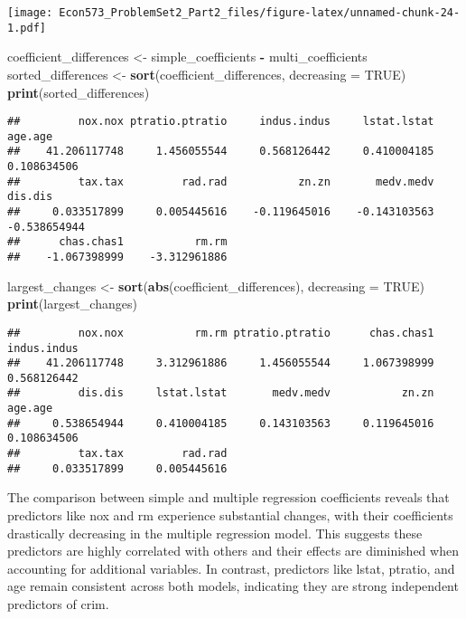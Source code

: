 \documentclass[
]{article}
\newenvironment{Shaded}{\begin{snugshade}}{\end{snugshade}}
\newcommand{\AttributeTok}[1]{\textcolor[rgb]{0.13,0.29,0.53}{#1}}
\newcommand{\ConstantTok}[1]{\textcolor[rgb]{0.56,0.35,0.01}{#1}}
\newcommand{\FunctionTok}[1]{\textcolor[rgb]{0.13,0.29,0.53}{\textbf{#1}}}
\newcommand{\NormalTok}[1]{#1}
\newcommand{\OtherTok}[1]{\textcolor[rgb]{0.56,0.35,0.01}{#1}}
\newcommand{\SpecialCharTok}[1]{\textcolor[rgb]{0.81,0.36,0.00}{\textbf{#1}}}
\begin{document}
\texttt{[image: Econ573\_ProblemSet2\_Part2\_files/figure-latex/unnamed-chunk-24-1.pdf]}

\begin{Shaded}
\begin{Highlighting}[]
\NormalTok{coefficient\_differences }\OtherTok{\textless{}{-}}\NormalTok{ simple\_coefficients }\SpecialCharTok{{-}}\NormalTok{ multi\_coefficients}
\NormalTok{sorted\_differences }\OtherTok{\textless{}{-}} \FunctionTok{sort}\NormalTok{(coefficient\_differences, }\AttributeTok{decreasing =} \ConstantTok{TRUE}\NormalTok{)}
\FunctionTok{print}\NormalTok{(sorted\_differences)}
\end{Highlighting}
\end{Shaded}

\begin{verbatim}
##         nox.nox ptratio.ptratio     indus.indus     lstat.lstat         age.age 
##    41.206117748     1.456055544     0.568126442     0.410004185     0.108634506 
##         tax.tax         rad.rad           zn.zn       medv.medv         dis.dis 
##     0.033517899     0.005445616    -0.119645016    -0.143103563    -0.538654944 
##      chas.chas1           rm.rm 
##    -1.067398999    -3.312961886
\end{verbatim}

\begin{Shaded}
\begin{Highlighting}[]
\NormalTok{largest\_changes }\OtherTok{\textless{}{-}} \FunctionTok{sort}\NormalTok{(}\FunctionTok{abs}\NormalTok{(coefficient\_differences), }\AttributeTok{decreasing =} \ConstantTok{TRUE}\NormalTok{)}
\FunctionTok{print}\NormalTok{(largest\_changes)}
\end{Highlighting}
\end{Shaded}

\begin{verbatim}
##         nox.nox           rm.rm ptratio.ptratio      chas.chas1     indus.indus 
##    41.206117748     3.312961886     1.456055544     1.067398999     0.568126442 
##         dis.dis     lstat.lstat       medv.medv           zn.zn         age.age 
##     0.538654944     0.410004185     0.143103563     0.119645016     0.108634506 
##         tax.tax         rad.rad 
##     0.033517899     0.005445616
\end{verbatim}

The comparison between simple and multiple regression coefficients
reveals that predictors like nox and rm experience substantial changes,
with their coefficients drastically decreasing in the multiple
regression model. This suggests these predictors are highly correlated
with others and their effects are diminished when accounting for
additional variables. In contrast, predictors like lstat, ptratio, and
age remain consistent across both models, indicating they are strong
independent predictors of crim.
\end{document}
